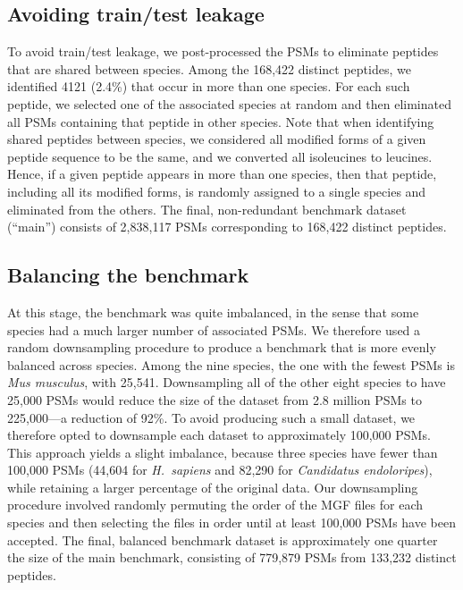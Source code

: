 \documentclass{article}
\begin{document}
\subsection*{Avoiding train/test leakage}

To avoid train/test leakage, we post-processed the PSMs to eliminate peptides that are shared between species.
Among the 168,422 distinct peptides, we identified 4121 (2.4\%) that occur in more than one species.
For each such peptide, we selected one of the associated species at random and then eliminated all PSMs containing that peptide in other species.
Note that when identifying shared peptides between species, we considered all modified forms of a given peptide sequence to be the same, and we converted all isoleucines to leucines.
Hence, if a given peptide appears in more than one species, then that peptide, including all its modified forms, is randomly assigned to a single species and eliminated from the others.
The final, non-redundant benchmark dataset (``main'') consists of 2,838,117 PSMs corresponding to 168,422 distinct peptides.

\subsection*{Balancing the benchmark}

At this stage, the benchmark was quite imbalanced, in the sense that some species had a much larger number of associated PSMs.
We therefore used a random downsampling procedure to produce a benchmark that is more evenly balanced across species.
Among the nine species, the one with the fewest PSMs is \textit{Mus musculus}, with 25,541.
Downsampling all of the other eight species to have 25,000 PSMs would reduce the size of the dataset from 2.8 million PSMs to 225,000---a reduction of 92\%.
To avoid producing such a small dataset, we therefore opted to downsample each dataset to approximately 100,000 PSMs.
This approach yields a slight imbalance, because three species have fewer than 100,000 PSMs (44,604 for \textit{H.\ sapiens} and 82,290 for \textit{Candidatus endoloripes}), while retaining a larger percentage of the original data.
Our downsampling procedure involved randomly permuting the order of the MGF files for each species and then selecting the files in order until at least 100,000 PSMs have been accepted.
The final, balanced benchmark dataset is approximately one quarter the size of the main benchmark, consisting of 779,879 PSMs from 133,232 distinct peptides.
\end{document}
